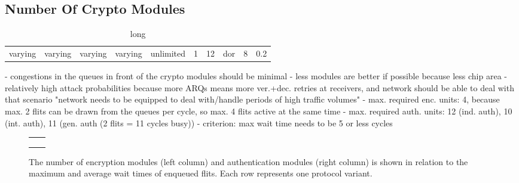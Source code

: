 \subsection{Number Of Crypto Modules}
\begin{table}
    \centering
    \begin{tabulary}{\textwidth}{C|C|C|C|C|C|C|C|C|C}
        \pProtVar{} & \pNCMode{} & \pEncMods{} & \pAuthMods{} & \pRQSize{} & \pARQLimit{} & \pARQTimeout{} & \pRStrat{} & \pNumAttackers{} & \pAttackProb{} \\\hline
        varying     & varying    & varying     & varying      & unlimited  & 1            & 12             & \gls{dor}  & 8                & 0.2 \\
    \end{tabulary}
    \caption[Input parameters for number of crypto modules experiment]{long}
    \label{tab:setupnumcrypto}
\end{table}
- congestions in the queues in front of the crypto modules should be minimal
- less modules are better if possible because less chip area
- relatively high attack probabilities because more ARQs means more ver.+dec. retries at receivers, and network should be able to deal with that scenario
  "network needs to be equipped to deal with/handle periods of high traffic volumes"
- max. required enc. units: 4, because max. 2 flits can be drawn from the queues per cycle, so max. 4 flits active at the same time
- max. required auth. units: 12 (ind. auth), 10 (int. auth), 11 (gen. auth (2 flits = 11 cycles busy))
- criterion: max wait time needs to be 5 or less cycles

\begin{figure}
    \centering
    \begin{tabular}{ll}
         &  \\
         &  \\
         & 
    \end{tabular}
    \caption[Results for number of crypto modules experiment]{The number of encryption modules (left column) and authentication modules (right column)
    is shown in relation to the maximum and average wait times of enqueued flits. Each row represents one protocol variant.}
    \label{fig:resultscryptomodules}
\end{figure}

